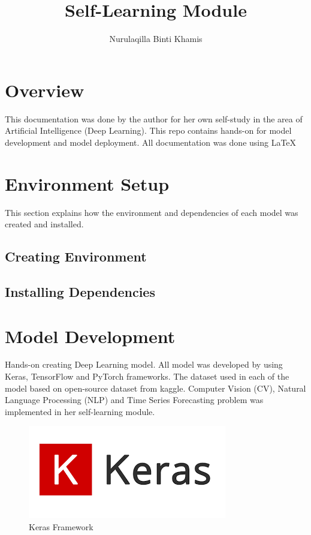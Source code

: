\documentclass[12pt, a4paper]{report}
\title{Self-Learning Module}
\author{Nurulaqilla Binti Khamis}
\begin{document}
\newpage

\maketitle

\tableofcontents

\newpage

\section{Overview}

This documentation was done by the author for her own self-study in the area of Artificial Intelligence (Deep Learning). This repo contains hands-on for model development and model deployment. All documentation was done using \LaTeX

\section{Environment Setup}
This section explains how the environment and dependencies of each model was created and installed.


\subsection{Creating Environment}
\subsection{Installing Dependencies}

\section{Model Development}
Hands-on creating Deep Learning model. All model was developed by using Keras, TensorFlow and PyTorch frameworks. The dataset used in each of the model based on open-source dataset from kaggle. Computer Vision (CV), Natural Language Processing (NLP) and Time Series Forecasting problem was implemented in her self-learning module.

\begin{figure}[h!]
    \centering
    \includegraphics[]{figs/keras.png}
    \caption{Keras Framework}
\end{figure}
\end{document}
